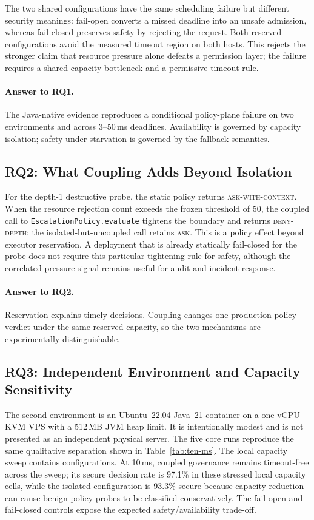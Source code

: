 The two shared configurations have the same scheduling failure but different
security meanings: fail-open converts a missed deadline into an unsafe
admission, whereas fail-closed preserves safety by rejecting the request.
Both reserved configurations avoid the measured timeout region on both
hosts. This rejects the stronger claim that resource pressure alone defeats a
permission layer; the failure requires a shared capacity bottleneck and a
permissive timeout rule.

\paragraph{Answer to RQ1.}
The Java-native evidence reproduces a conditional policy-plane failure on
two environments and across 3--50\,ms deadlines. Availability is governed by
capacity isolation; safety under starvation is governed by the fallback
semantics.

\subsection{RQ2: What Coupling Adds Beyond Isolation}
\label{sec:eval-joint}

For the depth-1 destructive probe, the static policy returns
\textsc{ask-with-context}. When the resource rejection count exceeds the
frozen threshold of 50, the coupled call to
\texttt{EscalationPolicy.evaluate} tightens the boundary and returns
\textsc{deny-depth}; the isolated-but-uncoupled call retains \textsc{ask}.
This is a policy effect beyond executor reservation. A deployment that is
already statically fail-closed for the probe does not require this particular
tightening rule for safety, although the correlated pressure signal remains
useful for audit and incident response.

\paragraph{Answer to RQ2.}
Reservation explains timely decisions. Coupling changes one production-policy
verdict under the same reserved capacity, so the two mechanisms are
experimentally distinguishable.

\subsection{RQ3: Independent Environment and Capacity Sensitivity}
\label{sec:eval-threshold}

The second environment is an Ubuntu~22.04 Java~21 container on a one-vCPU KVM
VPS with a 512\,MB JVM heap limit. It is intentionally modest and is not
presented as an independent physical server. The five core runs reproduce the
same qualitative separation shown in Table~\ref{tab:ten-ms}. The local
capacity sweep contains \ComputingCapacityConfigCount{} configurations. At
10\,ms, coupled governance remains timeout-free across the sweep; its secure
decision rate is 97.1\% in these stressed local capacity cells, while the
isolated configuration is 93.3\% secure because capacity reduction can cause
benign policy probes to be classified conservatively. The fail-open and
fail-closed controls expose the expected safety/availability trade-off.

